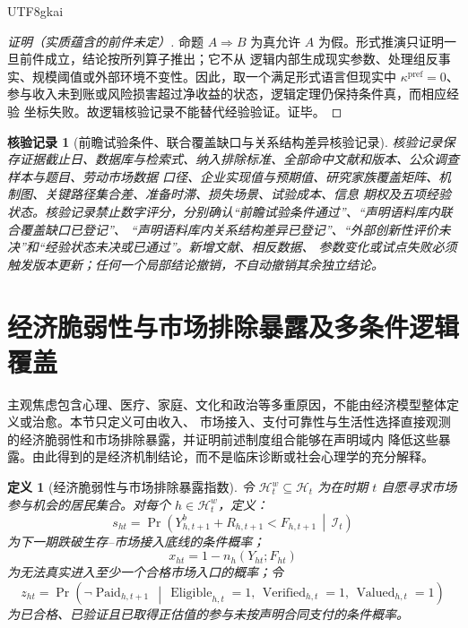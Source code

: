 \documentclass[12pt,a4paper,openany]{report}
\newtheorem{definition}{定义}[chapter]
\newtheorem{Certificate}{核验记录}[chapter]
\DeclareMathOperator{\Eligible}{Eligible}
\DeclareMathOperator{\Verified}{Verified}
\DeclareMathOperator{\Valued}{Valued}
\DeclareMathOperator{\Paid}{Paid}
\begin{document}
\begin{CJK*}{UTF8}{gkai}
\begin{proof}[证明（实质蕴含的前件未定）]
命题 \(A\Rightarrow B\) 为真允许 \(A\) 为假。形式推演只证明一旦前件成立，结论按所列算子推出；它不从
逻辑内部生成现实参数、处理组反事实、规模阈值或外部环境不变性。因此，取一个满足形式语言但现实中
\(\kappa^{\mathrm{pref}}=0\)、参与收入未到账或风险损害超过净收益的状态，逻辑定理仍保持条件真，而相应经验
坐标失败。故逻辑核验记录不能替代经验验证。证毕。
\end{proof}

\begin{Certificate}[前瞻试验条件、联合覆盖缺口与关系结构差异核验记录]
核验记录保存证据截止日、数据库与检索式、纳入排除标准、全部命中文献和版本、公众调查样本与题目、劳动市场数据
口径、企业实现值与预期值、研究家族覆盖矩阵、机制图、关键路径集合差、准备时滞、损失场景、试验成本、信息
期权及五项经验状态。核验记录禁止数字评分，分别确认“前瞻试验条件通过”、“声明语料库内联合覆盖缺口已登记”、
“声明语料库内关系结构差异已登记”、“外部创新性评价未决”和“经验状态未决或已通过”。新增文献、相反数据、
参数变化或试点失败必须触发版本更新；任何一个局部结论撤销，不自动撤销其余独立结论。
\end{Certificate}

\section{经济脆弱性与市场排除暴露及多条件逻辑覆盖}
\label{sec:economic-anxiety-gap}

主观焦虑包含心理、医疗、家庭、文化和政治等多重原因，不能由经济模型整体定义或治愈。本节只定义可由收入、
市场接入、支付可靠性与生活性选择直接观测的经济脆弱性和市场排除暴露，并证明前述制度组合能够在声明域内
降低这些暴露。由此得到的是经济机制结论，而不是临床诊断或社会心理学的充分解释。

\begin{definition}[经济脆弱性与市场排除暴露指数]
令 \(\mathcal H_t^w\subseteq\mathcal H_t\) 为在时期 \(t\) 自愿寻求市场参与机会的居民集合。对每个
\(h\in\mathcal H_t^w\)，定义：
\[
  s_{ht}
  =
  \Pr\!\left(
  Y_{h,t+1}^{b}+R_{h,t+1}<F_{h,t+1}
  \,\middle|\,\mathcal I_t
  \right)
\]
为下一期跌破生存--市场接入底线的条件概率；
\[
  x_{ht}=1-n_h(Y_{ht};F_{ht})
\]
为无法真实进入至少一个合格市场入口的概率；令
\[
  z_{ht}
  =
  \Pr\!\left(
  \neg\Paid_{h,t+1}
  \,\middle|\,
  \Eligible_{h,t}=1,\,
  \Verified_{h,t}=1,\,
  \Valued_{h,t}=1
  \right)
\]
为已合格、已验证且已取得正估值的参与未按声明合同支付的条件概率。


\end{definition}
\end{CJK*}
\end{document}
